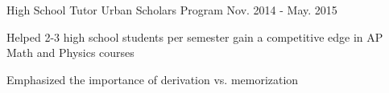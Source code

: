 \begin{cventries}
\iffalse
  \cventry
    {Office Assistant} %
    {Zahn Innovation Center} %
	{Jan. 2015 - May. 2015} %
    {} %
    {
      \begin{cvitems} %
        \item {Processed applications and deliverables from competing startups}
        \item {Sorted incoming internship and funding offers and directed them
		  to the appropriate individuals}
        \item {Discussed plans with the competing teams and provided feedback
		  on their ideas}
        \item {Organized events to inspire entrepreneurship in startup members}
      \end{cvitems}
    }
\fi

\iftrue
  \cventry
    {High School Tutor} %
    {Urban Scholars Program} %
	{Nov. 2014 - May. 2015} %
    {} %
    {
      \begin{cvitems} %
        \item {Helped 2-3 high school students per semester gain a competitive
		  edge in AP Math and Physics courses}
        \item {Emphasized the importance of derivation vs. memorization}
      \end{cvitems}
    }
\fi


\end{cventries}
